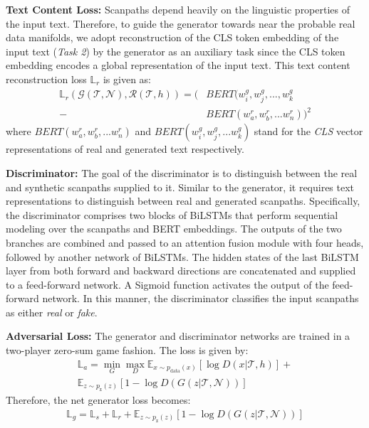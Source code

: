  \textbf{Text Content Loss:} Scanpaths depend heavily on the linguistic properties of the input text. Therefore, to guide the generator towards near the probable real data manifolds, we adopt reconstruction of the CLS token embedding of the input text (\textit{Task 2}) by the generator as an auxiliary task since the CLS token embedding encodes a global representation of the input text. 
This text content reconstruction loss $\mathbb{L}_r$ is given as: 
\begin{equation}
    \label{eq:Text Content Loss}
    \begin{aligned}
     \mathbb{L}_r(\mathcal{G}(\mathcal{T,}\mathcal{N}), \mathcal{R}(\mathcal{T},h)) = (&BERT(w_i^g,w_j^g,...,w_k^g\\-&BERT(w_a^r,w_b^r,...w_n^r))^2
    \end{aligned}
\end{equation}
where $BERT(w_a^r,w_b^r,...w_n^r)$ and $BERT(w_i^g,w_j^g,...w_k^g)$ stand for the \textit{CLS} vector representations of real and generated text respectively.

\textbf{Discriminator:} The goal of the discriminator is to distinguish between the real and synthetic scanpaths supplied to it. Similar to the generator, it requires text representations to distinguish between real and generated scanpaths. Specifically, the discriminator comprises two blocks of BiLSTMs that perform sequential modeling over the scanpaths and BERT embeddings. The outputs of the two branches are combined and passed to an attention fusion module with four heads, followed by another network of BiLSTMs. The hidden states of the last BiLSTM layer from both forward and backward directions are concatenated and supplied to a feed-forward network. A Sigmoid function activates the output of the feed-forward network. In this manner, the discriminator classifies the input scanpaths as either \textit{real} or \textit{fake}.

\textbf{Adversarial Loss:} The generator and discriminator networks are trained in a two-player zero-sum game fashion. The loss is given by:
\begin{equation}
    \label{eq:Adversarial Loss}
    \begin{aligned}
    \mathbb{L}_a = \min_{G}\max_{D}\mathbb{E}_{x\sim p_{\text{data}}(x)}[\log{D(x|\mathcal{T},h)}] + \\  \mathbb{E}_{z\sim p_{\text{z}}(z)}[1 - \log{D(G(z|\mathcal{T,N}))}]
    \end{aligned}
\end{equation}
Therefore, the net generator loss becomes:
\begin{equation}
    \label{eq:Net Generator Loss}
    \begin{aligned}
    \mathbb{L}_g = \mathbb{L}_s + \mathbb{L}_r + \mathbb{E}_{z\sim p_{\text{z}}(z)}[1 - \log{D(G(z|\mathcal{T,N}))}]
    \end{aligned}
\end{equation}

